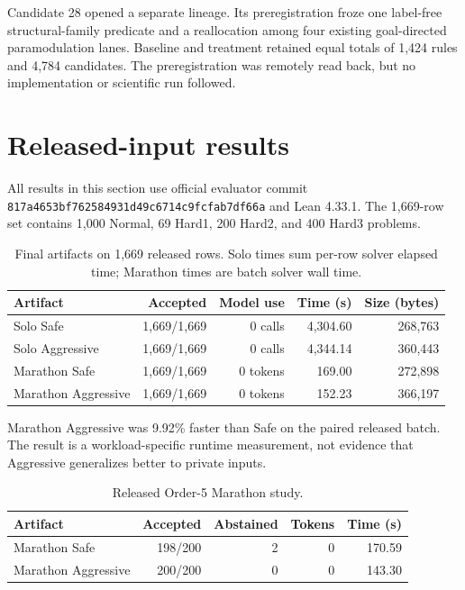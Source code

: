 \documentclass[10pt]{article}
\newcommand{\code}[1]{\texttt{#1}}
\begin{document}
Candidate 28 opened a separate lineage. Its preregistration froze one label-free structural-family predicate and a reallocation among four existing goal-directed paramodulation lanes. Baseline and treatment retained equal totals of 1,424 rules and 4,784 candidates. The preregistration was remotely read back, but no implementation or scientific run followed.

\section{Released-input results}

All results in this section use official evaluator commit \code{817a4653bf762584931d49c6714c9fcfab7df66a} and Lean 4.33.1. The 1,669-row set contains 1,000 Normal, 69 Hard1, 200 Hard2, and 400 Hard3 problems.

\begin{table}[ht]
\centering
\caption{Final artifacts on 1,669 released rows. Solo times sum per-row solver elapsed time; Marathon times are batch solver wall time.}
\label{tab:final1669}
\begin{tabularx}{\textwidth}{l r r r r}
\toprule
Artifact & Accepted & Model use & Time (s) & Size (bytes) \\
\midrule
Solo Safe & 1,669/1,669 & 0 calls & 4,304.60 & 268,763 \\
Solo Aggressive & 1,669/1,669 & 0 calls & 4,344.14 & 360,443 \\
Marathon Safe & 1,669/1,669 & 0 tokens & 169.00 & 272,898 \\
Marathon Aggressive & 1,669/1,669 & 0 tokens & 152.23 & 366,197 \\
\bottomrule
\end{tabularx}
\end{table}

Marathon Aggressive was 9.92\% faster than Safe on the paired released batch. The result is a workload-specific runtime measurement, not evidence that Aggressive generalizes better to private inputs.

\begin{table}[ht]
\centering
\caption{Released Order-5 Marathon study.}
\label{tab:order5}
\begin{tabularx}{0.82\textwidth}{l r r r r}
\toprule
Artifact & Accepted & Abstained & Tokens & Time (s) \\
\midrule
Marathon Safe & 198/200 & 2 & 0 & 170.59 \\
Marathon Aggressive & 200/200 & 0 & 0 & 143.30 \\
\bottomrule
\end{tabularx}
\end{table}
\end{document}
